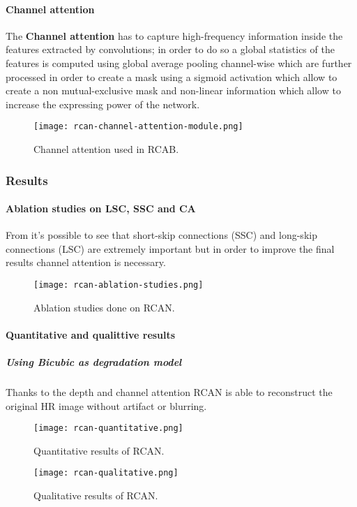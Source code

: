 \paragraph{Channel attention}
The \textbf{Channel attention} has to capture high-frequency information inside the features extracted by convolutions; in order to do so a global statistics of the features is computed using global average pooling channel-wise which are further processed in order to create a mask using a sigmoid activation which allow to create a non mutual-exclusive mask and non-linear information which allow to increase the expressing power of the network.
\begin{figure}
    \centering
    \texttt{[image: rcan-channel-attention-module.png]}
    \caption{Channel attention used in RCAB.}\label{rcan:channelattention}
\end{figure}

\subsubsection{Results}

\paragraph{Ablation studies on LSC, SSC and CA}
From  it's possible to see that short-skip connections (SSC) and long-skip connections (LSC) are extremely important but in order to improve the final results channel attention is necessary.
\begin{figure}[H]
    \centering
    \texttt{[image: rcan-ablation-studies.png]}
    \caption{Ablation studies done on RCAN.}\label{rcan:ablationstudies}
\end{figure}

\paragraph{Quantitative and qualittive results}
\subparagraph{Using Bicubic as degradation model}
Thanks to the depth and channel attention RCAN is able to reconstruct the original HR image without artifact or blurring.
\begin{figure}[H]
    \centering
    \texttt{[image: rcan-quantitative.png]}
    \caption{Quantitative results of RCAN.}
\end{figure}
\begin{figure}[H]
    \centering
    \texttt{[image: rcan-qualitative.png]}
    \caption{Qualitative results of RCAN.}
\end{figure}

